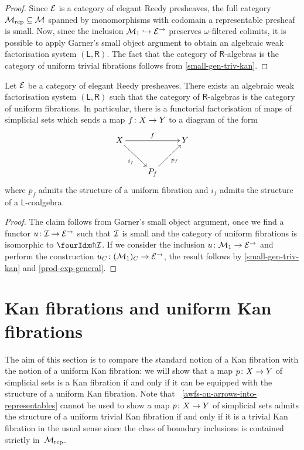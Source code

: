 \documentclass[reqno,10pt,a4paper,oneside]{amsart}
\begin{document}
\begin{proof} Since $\catE$ is a category of elegant Reedy presheaves, 
the full category $\cal{M}_{\textup{rep}} \subseteq \cal{M}$  spanned by 
 monomorphisms with codomain a representable
presheaf is small. Now, since 
the inclusion $\cal{M}_1 \hookrightarrow \catE^\to$ preserves $\omega$-filtered colimits, 
it is possible to apply Garner's small object argument to
obtain an algebraic weak factorisation system $(\mathsf{L}, \mathsf{R})$.
The fact that the category of $\mathsf{R}$-algebras is the category of uniform trivial fibrations
 follows from \cref{small-gen-triv-kan}.
 \end{proof} 


\begin{theorem} Let $\catE$ be a category of elegant Reedy presheaves. 
There exists an algebraic weak factorisation system $(\mathsf{L}, \mathsf{R})$
such that the category of $\mathsf{R}$-algebras is the category of uniform  fibrations. 
In particular, there is a functorial factorisation of maps of simplicial sets which sends
a map $f \co X \to Y$ to a diagram of the form
\[
\xymatrix{ 
X \ar[rr]^f \ar[dr]_{i_f}  & & Y \\
 & P_f \ar[ur]_{p_f} }
 \]
 where $p_f$ admits the structure of  a uniform  fibration and 
 $i_f$ admits the structure of a $\mathsf{L}$-coalgebra.
\end{theorem} 

\begin{proof} The claim follows from Garner's small object argument, once we find a 
functor $u \co \cal{I} \rightarrow \catE^\to$ such that $\cal{I}$ is small and the
category of uniform  fibrations is isomorphic to $\liftr{\cal{I}}$. If we consider
the inclusion $u \co \mathcal{M}_1 \to \cal{E}^\to$ and perform the construction
$u_\cyl \co (\mathcal{M}_1)_\cyl \to \catE^\to$, the result follows 
by \cref{small-gen-triv-kan} and \cref{prod-exp-general}. 
\end{proof}



\section{Kan fibrations and uniform Kan fibrations}
\label{section-kan-fib}

 The aim of this section is to compare the standard notion of a Kan fibration with the
 notion of a uniform Kan fibration: we will show that a map $p \co X \to Y$ of simplicial
 sets is a Kan fibration if and only if it can be equipped with the structure of a uniform
 Kan fibration. Note that ~\cref{awfs-on-arrows-into-representables} cannot be used to show 
a map $p \co X \to Y$ of simplicial sets admits the structure of a uniform trivial Kan  fibration if and only if it is a trivial Kan fibration in the usual sense since  the class of boundary inclusions  is contained strictly  in~$\cal{M}_{\mathrm{rep}}$. 
\end{document}
